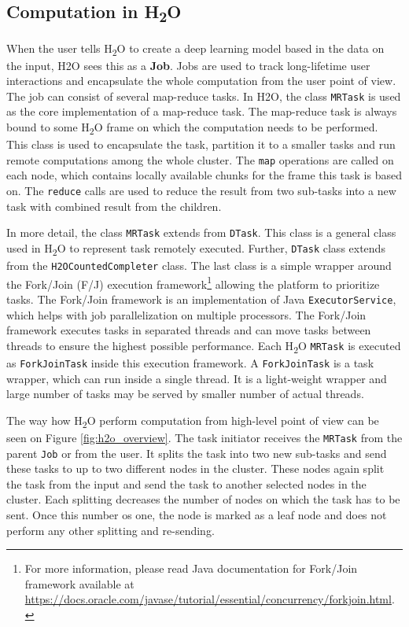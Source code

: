 \subsection{Computation in H\textsubscript{2}O}
When the user tells H\textsubscript{2}O to create a deep learning model based in the data on the input, H2O sees this as a \textbf{Job}. Jobs are used to track long-lifetime user interactions and encapsulate the whole computation from the user point of view. The job can consist of several map-reduce tasks. In H2O, the class \texttt{MRTask} is used as the core implementation of a map-reduce task. The map-reduce task is always bound to some H\textsubscript{2}O frame on which the computation needs to be performed. This class is used to encapsulate the task, partition it to a smaller tasks and run remote computations among the whole cluster. The \texttt{map} operations are called on each node, which contains locally available chunks for the frame this task is based on. The \texttt{reduce} calls are used to reduce the result from two sub-tasks into a new task with combined result from the children.

In more detail, the class \texttt{MRTask} extends from \texttt{DTask}. This class is a general class used in H\textsubscript{2}O to represent task remotely executed. Further, \texttt{DTask} class extends from the \texttt{H2OCountedCompleter} class. The last class is a simple wrapper around the Fork/Join (F/J) execution framework\footnote{For more information, please read Java documentation for Fork/Join framework available at \url{https://docs.oracle.com/javase/tutorial/essential/concurrency/forkjoin.html}.} allowing the platform to prioritize tasks. The Fork/Join framework is an implementation of Java \texttt{ExecutorService}, which helps with job parallelization on multiple processors. The Fork/Join framework executes tasks in separated threads and can move tasks between threads to ensure the highest possible performance. Each H\textsubscript{2}O \texttt{MRTask} is executed as \texttt{ForkJoinTask} inside this execution framework. A \texttt{ForkJoinTask} is a task wrapper, which can run inside a single thread. It is a light-weight wrapper and large number of tasks may be served by smaller number of actual threads.

The way how H\textsubscript{2}O perform computation from high-level point of view can be seen on Figure \ref{fig:h2o_overview}. The task initiator receives the \texttt{MRTask} from the parent \texttt{Job} or from the user. It splits the task into two new sub-tasks and send these tasks to up to two different nodes in the cluster. These nodes again split the task from the input and send the task to another selected nodes in the cluster. Each splitting decreases the number of nodes on which the task has to be sent. Once this number os one, the node is marked as a leaf node and does not perform any other splitting and re-sending.


